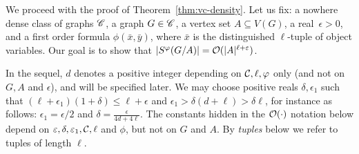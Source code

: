 We proceed with the proof of Theorem~\ref{thm:vc-density}.
%
 Let us fix: a nowhere dense class of graphs $\CCC$, a graph $G\in \CCC$, a vertex set $A\subseteq V(G)$, a real~$\epsilon>0$, and 
 a first order formula $\phi(\bar x,\bar y)$, where $\bar x$ is the distinguished $\ell$-tuple of object variables.
 Our goal is to show that $|S^\phi(G/A)|=\Oof(|A|^{\ell+\epsilon})$.
 	   
In the sequel, $d$ denotes a positive integer 
depending on ${\cal C},\ell,\phi$ only (and not on $G, A$ and $\epsilon$), and will be specified later. We may choose positive reals
$\delta,\epsilon_1$ such that 
	 $(\ell+\epsilon_1)(1+\delta) 
	 \le
	 \ell+\epsilon$ and $\epsilon_1>\delta(d+\ell)> \delta\ell$, for instance as follows: $\epsilon_1=\epsilon/2$ and $\delta=\frac{\epsilon}{4d+4\ell}$.
The constants hidden in the $\Oof(\cdot)$ notation below depend
 on $\epsilon,\delta,\epsilon_1,\cal C, \ell$ and $\phi$, but not on $G$ and $A$.   By \emph{tuples} below we refer to tuples of length $\ell$.

